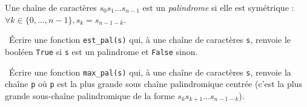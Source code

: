 \exer{}
\setcounter{numques}{0}

Une chaîne de caractères $s_0s_1\dots s_{n-1}$ est un \emph{palindrome} si elle est \og symétrique\fg{} : $\forall k \in \{0,\dots,n-1\}, s_k = s_{n-1-k}$.


\question\ \'Ecrire une fonction \texttt{est\_pal(s)} qui, à une chaîne de caractères \texttt{s}, renvoie le booléen \texttt{True} si \texttt{s} est un palindrome et \texttt{False} sinon.

\question\ \'Ecrire une fonction \texttt{max\_pal(s)} qui, à une chaîne de caractères \texttt{s}, renvoie la chaîne \texttt{p} où \texttt{p} est la plus grande sous chaîne palindromique centrée (c'est la plus grande sous-chaîne palindromique de la forme $s_ks_{k+1}\dots s_{n-1-k}$).
